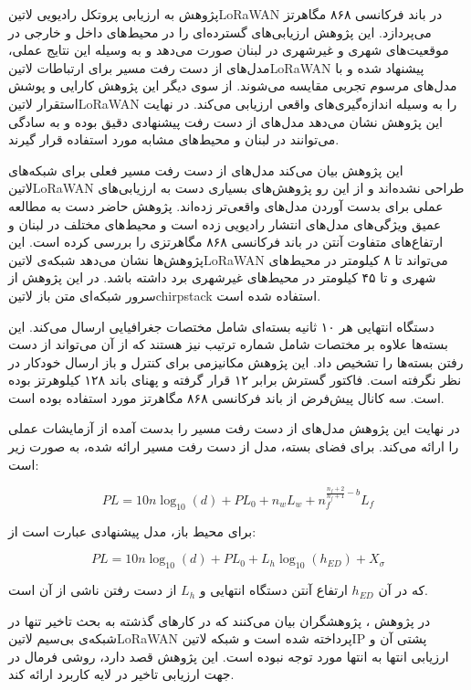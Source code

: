 
پژوهش  به ارزیابی پروتکل رادیویی ‌لاتین{LoRaWAN} در باند فرکانسی ۸۶۸ مگاهرتز می‌پردازد.
این پژوهش ارزیابی‌های گسترده‌ای را در محیط‌های داخل و خارجی در موقعیت‌های شهری و غیرشهری در لبنان صورت می‌دهد
و به وسیله این نتایج عملی، مدل‌های از دست رفت مسیر برای ارتباطات ‌لاتین{LoRaWAN} پیشنهاد شده و با مدل‌های مرسوم تجربی مقایسه می‌شوند.
از سوی دیگر این پژوهش کارایی و پوشش استقرار ‌لاتین{LoRaWAN} را به وسیله اندازه‌گیری‌های واقعی ارزیابی می‌کند.
در نهایت این پژوهش نشان می‌دهد مدل‌های از دست رفت پیشنهادی دقیق بوده و به سادگی می‌توانند در لبنان و محیط‌های مشابه مورد استفاده قرار گیرند.

این پژوهش بیان می‌کند مدل‌های از دست رفت مسیر فعلی برای شبکه‌های ‌لاتین{LoRaWAN} طراحی نشده‌اند و از این رو پژوهش‌های بسیاری دست به ارزیابی‌های عملی
برای بدست آوردن مدل‌های واقعی‌تر زده‌اند. پژوهش حاضر دست به مطالعه عمیق ويژگی‌های مدل‌های انتشار رادیویی زده است و محیط‌های مختلف در لبنان و ارتفاع‌های متفاوت
آنتن در باند فرکانسی ۸۶۸ مگاهرتزی را بررسی کرده است. این پژوهش‌ها نشان می‌دهد شبکه‌ی ‌لاتین{LoRaWAN} می‌تواند تا ۸ کیلومتر در محیط‌های شهری و تا ۴۵ کیلومتر
در محیط‌های غیرشهری برد داشته باشد.
در این پژوهش از سرور شبکه‌ای متن باز ‌لاتین{chirpstack} استفاده شده است.

دستگاه انتهایی هر ۱۰ ثانیه بسته‌ای شامل مختصات جغرافیایی ارسال می‌کند. این بسته‌ها علاوه بر مختصات شامل شماره ترتیب نیز هستند که از آن می‌تواند از دست رفتن بسته‌ها را تشخیص داد.
این پژوهش مکانیزمی برای کنترل و باز ارسال خودکار در نظر نگرفته است.
فاکتور گسترش برابر ۱۲ قرار گرفته و پهنای باند ۱۲۸ کیلوهرتز بوده است. سه کانال پیش‌فرض از باند فرکانسی ۸۶۸ مگاهرتز مورد استفاده بوده است.

در نهایت این پژوهش مدل‌های از دست رفت مسیر را بدست آمده از آزمایشات عملی را ارائه می‌کند. برای فضای بسته، مدل از دست رفت مسیر ارائه شده، به صورت زیر است:

\[
  PL = 10n\log_{10}(d) + PL_{0} + n_w L_w + n_f^{\frac{n_f+2}{n_f+1}-b}L_f
\]

برای محیط باز، مدل پیشنهادی عبارت است از:

\[
  PL = 10n\log_{10}(d) + PL_0 + L_h\log_{10}(h_{ED}) + X_{\sigma}
\]

که در آن $h_{ED}$ ارتفاع آنتن دستگاه انتهایی و $L_h$ از دست رفتن ناشی از آن است.



در پژوهش ، پژوهشگران بیان می‌کنند که در کارهای گذشته به بحث تاخیر تنها در شبکه‌ی بی‌سیم ‌لاتین{LoRaWAN} پرداخته شده است و شبکه ‌لاتین{IP}
پشتی آن و ارزیابی انتها به انتها مورد توجه نبوده است.
این پژوهش قصد دارد، روشی فرمال در جهت ارزیابی تاخیر در لایه کاربرد ارائه کند.

